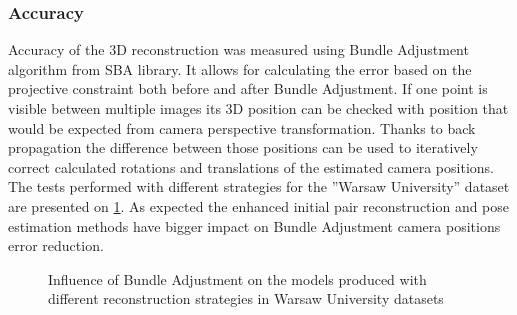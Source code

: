 \subsubsection{Accuracy}
Accuracy of the 3D reconstruction was measured using Bundle Adjustment algorithm from SBA library\cite{website:sba}. It allows for calculating the error based on the projective constraint both before and after Bundle Adjustment. If one point is visible between multiple images its 3D position can be checked with position that would be expected from camera perspective transformation. Thanks to back propagation the difference between those positions can be used to iteratively correct calculated rotations and translations of the estimated camera positions. \\
The tests performed with different strategies  for the ''Warsaw University'' dataset are presented on \ref{plot:BAError}. As expected the enhanced initial pair reconstruction and pose estimation methods have bigger impact on Bundle Adjustment camera positions error reduction.
\begin{figure}[h!]
  \begin{center}
    \caption{Influence of Bundle Adjustment on the models produced with different reconstruction strategies in Warsaw University datasets}
    \label{plot:BAError}
  \end{center}
\end{figure}
